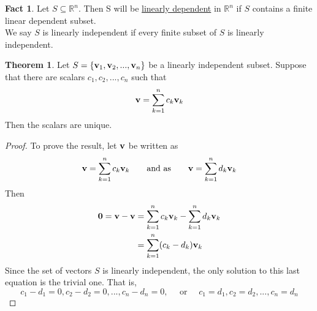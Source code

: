 \documentclass{article}
\theoremstyle{definition}
\newtheorem{theorem}{Theorem}
\newtheorem*{fact}{Fact}
\newcommand{\reals}{\mathbb{R}}
\begin{document}
\begin{fact}
	Let $S \subseteq \reals^n$. Then S will be \underline{linearly dependent} in $\reals^n$ if $S$ contains a finite linear dependent subset.\\
	We say $S$ is linearly independent if every finite subset of $S$ is linearly independent.
\end{fact}

\begin{theorem}
	\label{lindep_unique}
	Let $S = \{ \vb{v}_1, \vb{v}_2, ..., \vb{v}_n \}$ be a linearly independent subset. Suppose that there are scalars $c_1, c_2, ..., c_n$ such that
	\[ \vb{v} = \sum_{k=1}^{n}c_k\vb{v}_k \]
	Then the scalars are unique.
	\begin{proof}
		To prove the result, let $\vb{v}$ be written as
		\[ \vb{v} = \sum_{k=1}^{n}c_k\vb{v}_k \qquad \text{and as} \qquad \vb{v} = \sum_{k=1}^{n}d_k\vb{v}_k \]
		Then
		\begin{align}
			\vb{0} = \vb{v} - \vb{v} &= \sum_{k=1}^nc_k\vb{v}_k - \sum_{k=1}^nd_k\vb{v}_k\\
			&= \sum_{k=1}^{n}(c_k - d_k)\vb{v}_k
		\end{align}
		Since the set of vectors $S$ is linearly independent, the only solution to this last equation is the trivial one. That is,
		\[ c_1 - d_1 = 0, c_2 - d_2 = 0, ..., c_n - d_n = 0, \quad \text{ or } \quad c_1 = d_1, c_2 = d_2, ..., c_n = d_n \]
	\end{proof}
\end{theorem}
\end{document}
